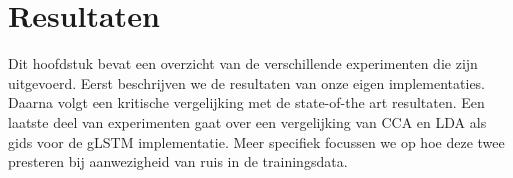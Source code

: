 \chapter{Resultaten} %
\label{cha:resultaten}
Dit hoofdstuk bevat een overzicht van de verschillende experimenten die zijn uitgevoerd. Eerst beschrijven we de resultaten van onze eigen implementaties. Daarna volgt een kritische vergelijking met de state-of-the art resultaten. Een laatste deel van experimenten gaat over een vergelijking van CCA en LDA als gids voor de gLSTM implementatie. Meer specifiek focussen we op hoe deze twee presteren bij aanwezigheid van ruis in de trainingsdata.

